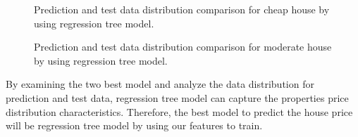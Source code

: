 \documentclass[11pt,a4paper]{article}
\begin{document}
\begin{figure}[h]
    \centering
    \hfill%
    \caption{Prediction and test data distribution comparison for cheap house by using regression tree model.}
    \label{fig:regtreecheap}
\end{figure}
\begin{figure}[h]
    \centering
    \hfill%
    \caption{Prediction and test data distribution comparison for moderate house by using regression tree model.}
    \label{fig:regtreemoderate}
\end{figure}
\FloatBarrier
By examining the two best model and analyze the data distribution for prediction and test data, regression tree model can capture the properties price distribution characteristics. Therefore, the best model to predict the house price will be regression tree model by using our features to train.
\FloatBarrier
\end{document}
